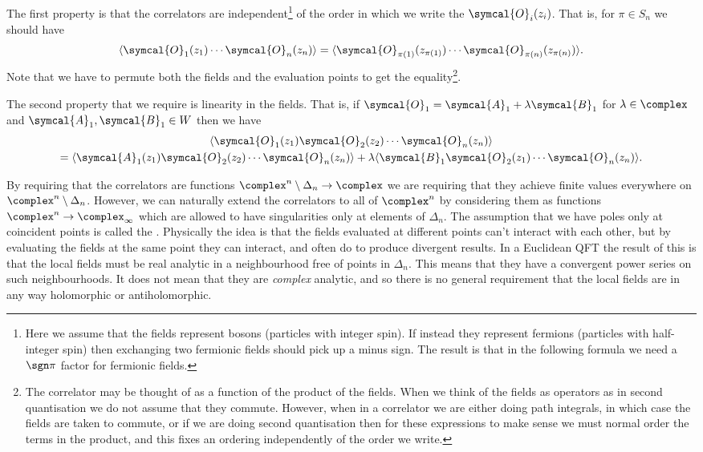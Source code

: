 \documentclass[fleqn]{NotesClass}
\newcommand{\quantumField}[1]{\symcal{#1}}
\DeclarePairedDelimiter{\correlator}{\langle}{\rangle}
\begin{document}
    The first property is that the correlators are independent\footnote{Here we assume that the fields represent bosons (particles with integer spin). If instead they represent fermions (particles with half-integer spin) then exchanging two fermionic fields should pick up a minus sign. The result is that in the following formula we need a \(\sgn \pi\) factor for fermionic fields.} of the order in which we write the \(\quantumField{O}_i(z_i)\).
    That is, for \(\pi \in S_n\) we should have
    \begin{equation}
        \correlator{\quantumField{O}_1(z_1) \dotsm \quantumField{O}_n(z_n)} = \correlator{\quantumField{O}_{\pi(1)}(z_{\pi(1)}) \dotsm \quantumField{O}_{\pi(n)}(z_{\pi(n)})}.
    \end{equation}
    Note that we have to permute both the fields and the evaluation points to get the equality\footnote{The correlator may be thought of as a function of the product of the fields. When we think of the fields as operators as in second quantisation we do not assume that they commute. However, when in a correlator we are either doing path integrals, in which case the fields are taken to commute, or if we are doing second quantisation then for these expressions to make sense we must normal order the terms in the product, and this fixes an ordering independently of the order we write.}.
    
    The second property that we require is linearity in the fields.
    That is, if \(\quantumField{O}_1 = \quantumField{A}_1 + \lambda \quantumField{B}_1\) for \(\lambda \in \complex\) and \(\quantumField{A}_1, \quantumField{B}_1 \in W\) then we have
    \begin{multline}
        \correlator{\quantumField{O}_1(z_1) \quantumField{O}_2(z_2) \dotsm \quantumField{O}_n(z_n)}\\
        = \correlator{\quantumField{A}_1(z_1) \quantumField{O}_2(z_2) \dotsm \quantumField{O}_n(z_n)} + \lambda \correlator{\quantumField{B}_1 \quantumField{O}_2(z_1) \dotsm \quantumField{O}_n(z_n)}.
    \end{multline}
    
    By requiring that the correlators are functions \(\complex^n\setminus \Delta_n \to \complex\) we are requiring that they achieve finite values everywhere on \(\complex^n\setminus \Delta_n\).
    However, we can naturally extend the correlators to all of \(\complex^n\) by considering them as functions \(\complex^n \to \complex_{\infty}\) which are allowed to have singularities only at elements of \(\Delta_n\).
    The assumption that we have poles only at coincident points is called the .
    Physically the idea is that the fields evaluated at different points can't interact with each other, but by evaluating the fields at the same point they can interact, and often do to produce divergent results.
    In a Euclidean QFT the result of this is that the local fields must be real analytic in a neighbourhood free of points in \(\Delta_n\).
    This means that they have a convergent power series on such neighbourhoods.
    It does not mean that they are \emph{complex} analytic, and so there is no general requirement that the local fields are in any way holomorphic or antiholomorphic.
    
\end{document}
